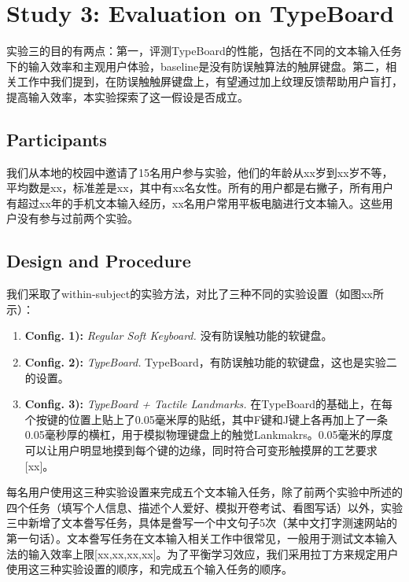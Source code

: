 \section{Study 3: Evaluation on TypeBoard}

实验三的目的有两点：第一，评测TypeBoard的性能，包括在不同的文本输入任务下的输入效率和主观用户体验，baseline是没有防误触算法的触屏键盘。第二，相关工作中我们提到，在防误触触屏键盘上，有望通过加上纹理反馈帮助用户盲打，提高输入效率，本实验探索了这一假设是否成立。

\subsection{Participants}

我们从本地的校园中邀请了15名用户参与实验，他们的年龄从xx岁到xx岁不等，平均数是xx，标准差是xx，其中有xx名女性。所有的用户都是右撇子，所有用户有超过xx年的手机文本输入经历，xx名用户常用平板电脑进行文本输入。这些用户没有参与过前两个实验。

\subsection{Design and Procedure}

我们采取了within-subject的实验方法，对比了三种不同的实验设置（如图xx所示）：

\begin{enumerate}
	\item{\textbf{Config. 1):} \emph{Regular Soft Keyboard.} 没有防误触功能的软键盘。}
	\item{\textbf{Config. 2):} \emph{TypeBoard.} TypeBoard，有防误触功能的软键盘，这也是实验二的设置。}
	\item{\textbf{Config. 3):} \emph{TypeBoard + Tactile Landmarks.} 在TypeBoard的基础上，在每个按键的位置上贴上了0.05毫米厚的贴纸，其中F键和J键上各再加上了一条0.05毫秒厚的横杠，用于模拟物理键盘上的触觉Lankmakrs。0.05毫米的厚度可以让用户明显地摸到每个键的边缘，同时符合可变形触摸屏的工艺要求[xx]。}
\end{enumerate}

每名用户使用这三种实验设置来完成五个文本输入任务，除了前两个实验中所述的四个任务（填写个人信息、描述个人爱好、模拟开卷考试、看图写话）以外，实验三中新增了文本誊写任务，具体是誊写一个中文句子5次（某中文打字测速网站的第一句话）。文本誊写任务在文本输入相关工作中很常见，一般用于测试文本输入法的输入效率上限[xx,xx,xx,xx]。为了平衡学习效应，我们采用拉丁方来规定用户使用这三种实验设置的顺序，和完成五个输入任务的顺序。


